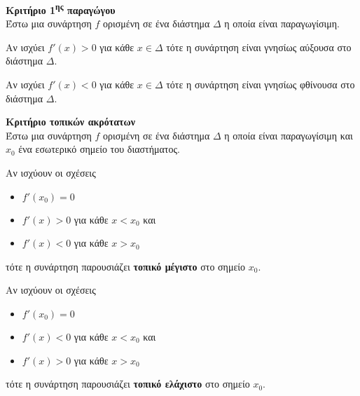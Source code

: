 \documentclass[twoside,nofonts,internet,math,spyros]{frontisthrio}
\newcommand{\tss}[1]{\textsuperscript{#1}}
\begin{document}
\begin{arithmisi}
\item\textbf{Κριτήριο 1\tss{ης} παραγώγου}\\
Έστω μια συνάρτηση $ f $ ορισμένη σε ένα διάστημα $ \varDelta $ η οποία είναι παραγωγίσιμη.
\begin{rlist}
\item Αν ισχύει $ f'(x)>0 $ για κάθε $ x\in\varDelta $ τότε η συνάρτηση είναι γνησίως αύξουσα στο διάστημα $ \varDelta $.
\item Αν ισχύει $ f'(x)<0 $ για κάθε $ x\in\varDelta $ τότε η συνάρτηση είναι γνησίως φθίνουσα στο διάστημα $ \varDelta $.
\end{rlist}
\item\textbf{Κριτήριο τοπικών ακρότατων}\\
Έστω μια συνάρτηση $ f $ ορισμένη σε ένα διάστημα $ \varDelta $ η οποία είναι παραγωγίσιμη και $ x_0 $ ένα εσωτερικό σημείο του διαστήματος.
\begin{rlist}
\item Αν ισχύουν οι σχέσεις 
\begin{itemize}[leftmargin=4mm]
\item $ f'(x_0)=0 $
\item $ f'(x)>0 $ για κάθε $ x<x_0 $ και 
\item $ f'(x)<0 $ για κάθε $ x>x_0 $
\end{itemize}
τότε η συνάρτηση παρουσιάζει \textbf{τοπικό μέγιστο} στο σημείο $ x_0 $.
\item Αν ισχύουν οι σχέσεις
\begin{itemize}[leftmargin=4mm]
\item $ f'(x_0)=0 $
\item $ f'(x)<0 $ για κάθε $ x<x_0 $ και 
\item $ f'(x)>0 $ για κάθε $ x>x_0 $
\end{itemize}
τότε η συνάρτηση παρουσιάζει \textbf{τοπικό ελάχιστο} στο σημείο $ x_0 $.
\end{rlist}
\end{arithmisi}
\methodologia
\end{document}
